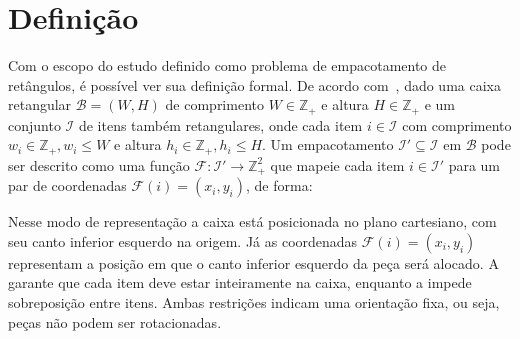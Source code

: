 \section{Definição}\label{sec:definicao}

Com o escopo do estudo definido como problema de empacotamento de retângulos, é possível ver sua
definição formal.
De acordo com~\cite{2DPackLib}, dado uma caixa retangular $\mathcal{B} = (W, H)$ de comprimento
$W \in \mathbb{Z}_+$ e altura $H \in \mathbb{Z}_+$ e um conjunto $\mathcal{I}$ de itens também
retangulares, onde cada item $i \in \mathcal{I}$ com comprimento $w_i \in \mathbb{Z}_+, w_i \le W$
e altura $h_i \in \mathbb{Z}_+, h_i \le H$.
Um empacotamento $\mathcal{I}' \subseteq \mathcal{I}$ em $\mathcal{B}$ pode ser descrito como uma função
$\mathcal{F}: \mathcal{I}' \to \mathbb{Z}_+^2$ que mapeie cada item $i \in \mathcal{I}'$ para um par
de coordenadas $\mathcal{F}(i) = (x_i, y_i)$, de forma:



Nesse modo de representação a caixa está posicionada no plano cartesiano, com seu canto inferior
esquerdo na origem.
Já as coordenadas $\mathcal{F}(i) = (x_i, y_i)$ representam a posição em que o canto inferior
esquerdo da peça será alocado.
A  garante que cada item deve estar inteiramente na caixa, enquanto a 
impede sobreposição entre itens.
Ambas restrições indicam uma orientação fixa, ou seja, peças não podem ser rotacionadas.
